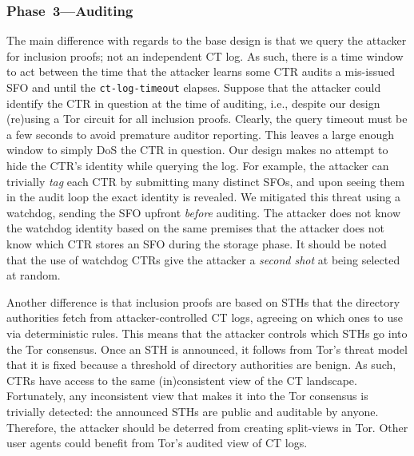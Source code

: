 \subsubsection{Phase~3---Auditing} \label{sec:auditor:analysis:phase3}
The main difference with regards to the base design is that we query the
attacker for inclusion proofs; not an independent CT log.  As such, there is a
time window to act between the time that the attacker learns some CTR audits a
mis-issued SFO and until the \texttt{ct-log-timeout} elapses.  Suppose that the
attacker could identify the CTR in question at the time of auditing, i.e.,
despite our design (re)using a Tor circuit for all inclusion proofs.  Clearly,
the query timeout must be a few seconds to avoid premature auditor reporting.
This leaves a large enough window to simply DoS the CTR in question.  Our design
makes no attempt to hide the CTR's identity while querying the log.  For
example, the attacker can trivially \emph{tag} each CTR by submitting many
distinct SFOs, and upon seeing them in the audit loop the exact identity is
revealed.  We mitigated this threat using a watchdog, sending the SFO upfront
\emph{before} auditing.  The attacker does not know the watchdog identity based
on the same premises that the attacker does not know which CTR stores an
SFO during the storage phase.  It should be noted that the use of watchdog CTRs
give the attacker a \emph{second shot} at being selected at random.

Another difference is that inclusion proofs are based on STHs that the directory
authorities fetch from attacker-controlled CT logs, agreeing on which ones to
use via deterministic rules.  This means that the attacker controls which STHs
go into the Tor consensus.  Once an STH is announced, it follows from Tor's
threat model that it is fixed because a threshold of directory authorities are
benign.  As such, CTRs have access to the same (in)consistent view of the CT
landscape.  Fortunately, any inconsistent view that makes it into the Tor
consensus is trivially detected:
	the announced STHs are public and auditable by anyone.
Therefore, the attacker should be deterred from creating split-views in Tor.
Other user agents could benefit from Tor's audited view of CT logs.


